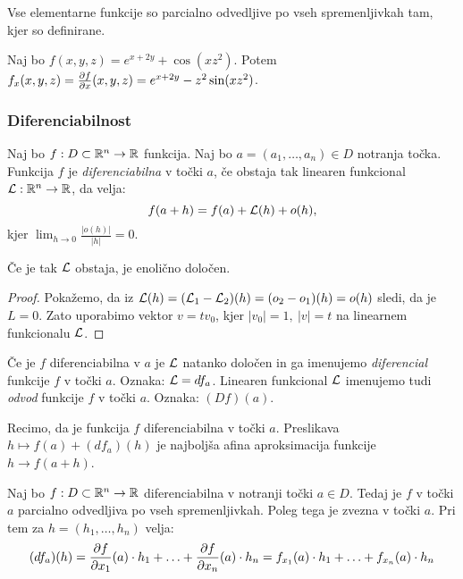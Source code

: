 \begin{opomba}
    Vse elementarne funkcije so parcialno odvedljive po vseh spremenljivkah tam, kjer so definirane.
\end{opomba}

\begin{zgled}
    Naj bo $f(x, y, z) = e^{x+2y} + \cos(xz^2)$. Potem $f_x(x, y, z) = \frac{\partial f}{\partial x}(x, y, z) = e^{x+2y} - z^2 \sin(xz^2)$.
\end{zgled}

\subsubsection{Diferenciabilnost}
\begin{definicija}
    Naj bo $f: D \subset \mathbb{R}^n \to \mathbb{R}$ funkcija. Naj bo $a = (a_1, \ldots, a_n) \in D$ notranja točka. Funkcija $f$ je \emph{diferenciabilna} v točki $a$, če obstaja tak linearen funkcional $\mathcal{L}: \mathbb{R}^n \to \mathbb{R}$, da velja:
    $$f(a+h) = f(a) + \mathcal{L}(h) + o(h),$$
    kjer $\lim_{h \to 0} \frac{|o(h)|}{|h|} = 0$.
\end{definicija}

\begin{opomba}
    Če je tak $\mathcal{L}$ obstaja, je enolično določen.
\end{opomba}

\begin{proof}
    Pokažemo, da iz $\mathcal{L}(h) = (\mathcal{L}_1 - \mathcal{L}_2)(h) = (o_2 - o_1)(h) = o(h)$ sledi, da je $L = 0$. Zato uporabimo vektor $v = tv_0$, kjer $|v_0| = 1, \ |v| = t$ na linearnem funkcionalu $\mathcal{L}$.
\end{proof}

\begin{definicija}
    Če je $f$ diferenciabilna v $a$ je $\mathcal{L}$ natanko določen in ga imenujemo \emph{diferencial} funkcije $f$ v točki $a$. Oznaka: $\mathcal{L} = df_a$. Linearen funkcional $\mathcal{L}$ imenujemo tudi \emph{odvod} funkcije $f$ v točki $a$. Oznaka: $(Df)(a)$.
\end{definicija}

\begin{opomba}
    Recimo, da je funkcija $f$ diferenciabilna v točki $a$. Preslikava $h \mapsto f(a) + (df_a)(h)$ je najboljša afina aproksimacija funkcije $h \to f(a+h)$.
\end{opomba}

\begin{trditev}
    Naj bo $f: D \subset \mathbb{R}^n \to \mathbb{R}$ diferenciabilna v notranji točki $a \in D$. Tedaj je $f$ v točki $a$ parcialno odvedljiva po vseh spremenljivkah. Poleg tega je zvezna v točki $a$. Pri tem za $h = (h_1, \ldots, h_n)$ velja:
    $$(df_a)(h) = \frac{\partial f}{\partial x_1}(a) \cdot h_1 + \ldots + \frac{\partial f}{\partial x_n}(a) \cdot h_n = f_{x_1}(a) \cdot h_1 + \ldots + f_{x_n}(a) \cdot h_n$$
\end{trditev}

